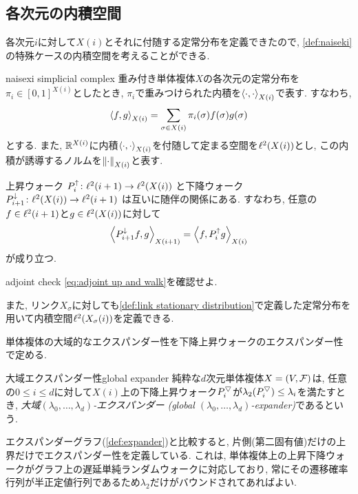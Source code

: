 \subsection{各次元の内積空間} \label{sec:inaiseki}
各次元$i$に対して$X(i)$とそれに付随する定常分布を定義できたので, \cref{def:naiseki}の特殊ケースの内積空間を考えることができる.
\begin{definition}{}{naisexi simplicial complex}
    重み付き単体複体$X$の各次元の定常分布を$\pi_i \in [0,1]^{X(i)}$としたとき, $\pi_i$で重みつけられた内積を$\left\langle\cdot,\cdot\right\rangle_{X(i)}$で表す.
    すなわち, 
    \[
        \left\langle f,g\right\rangle_{X(i)} = \sum_{\sigma \in X(i)} \pi_i(\sigma) f(\sigma)g(\sigma)
    \]
    とする.
    また, $\mathbb{R}^{X(i)}$に内積$\left\langle\cdot,\cdot\right\rangle_{X(i)}$を付随して定まる空間を$\ispace$とし,
    この内積が誘導するノルムを$\left\lVert\cdot\right\rVert_{X(i)}$と表す.
\end{definition}
%
上昇ウォーク
$\Pup_i\colon \ispace[i+1] \to \ispace$
と下降ウォーク
$\Pdown_{i+1} \colon \ispace \to \ispace[i+1]$
は互いに随伴の関係にある.
すなわち, 任意の$f\in \ispace[i+1]$と$g\in \ispace$に対して
\begin{align}
    \iprod[X(i+1)]{\Pdown_{i+1} f,g} =
    \iprod{f,\Pup_{i}g}
    \label{eq:adjoint up and walk}
\end{align}
が成り立つ.
%
\begin{exercise}{}{adjoint check}
\cref{eq:adjoint up and walk}を確認せよ.
\end{exercise}

また, リンク$X_\sigma$に対しても\cref{def:link stationary distribution}で定義した定常分布を用いて内積空間$\ispace[X_\sigma(i)]$を定義できる.

単体複体の大域的なエクスパンダー性を下降上昇ウォークのエクスパンダー性で定める.
\begin{definition}{大域エクスパンダー性}{global expander}
    純粋な$d$次元単体複体$X=(V,\mathcal{F})$は,
    任意の$0\le i \le d$に対して$X(i)$上の下降上昇ウォーク$P^{\bigtriangledown}_i$が$\lambda_2(P^{\bigtriangledown}_i)\le \lambda_i$を満たすとき,
    \emph{大域$(\lambda_0,\dots,\lambda_{d})$-エクスパンダー (global $(\lambda_0,\dots,\lambda_{d})$-expander)}であるという.
\end{definition}
エクスパンダーグラフ(\cref{def:expander})と比較すると, 片側(第二固有値)だけの上界だけでエクスパンダー性を定義している.
これは, 単体複体上の上昇下降ウォークがグラフ上の遅延単純ランダムウォークに対応しており, 常にその遷移確率行列が半正定値行列であるため$\lambda_2$だけがバウンドされてあればよい.

